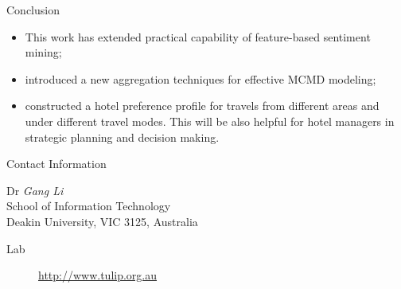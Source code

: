\documentclass[
 size=12pt,
 paper=smartboard, %
 mode=present, %
 display=slides, %
 style=tulip,  %
 pauseslide,
 fleqn,leqno,clock]{powerdot}
\begin{document}
\begin{slide}[toc=,bm=]{Conclusion}
\begin{itemize}
\item This work has extended practical capability of feature-based sentiment mining; \pause

\item introduced a new aggregation techniques for effective MCMD modeling; \pause
 
\item constructed a hotel preference profile for travels from different areas and under different travel modes.
This will be also helpful for hotel managers in strategic planning and decision making.
\end{itemize}
\pause
\begin{center}
\textcolor{red}{\scalebox{1.5}{Questions?}}
\end{center}
\end{slide}


\begin{wideslide}[toc=,bm=]{Contact Information}
\centering
{}
\twocolumn[
lcolwidth=0.35\linewidth,
rcolwidth=0.65\linewidth
]
{
}
{
Dr \emph{Gang Li}\\
School of Information Technology\\
Deakin University, VIC 3125, Australia
\begin{description}
 \item[Lab] \url{http://www.tulip.org.au} 
\end{description}
} 
\end{wideslide}
\end{document}
